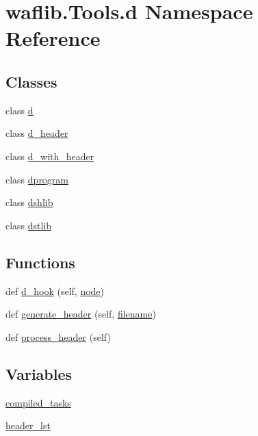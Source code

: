 \hypertarget{namespacewaflib_1_1_tools_1_1d}{}\section{waflib.\+Tools.\+d Namespace Reference}
\label{namespacewaflib_1_1_tools_1_1d}
\subsection*{Classes}
\begin{DoxyCompactItemize}
\item 
class \hyperlink{classwaflib_1_1_tools_1_1d_1_1d}{d}
\item 
class \hyperlink{classwaflib_1_1_tools_1_1d_1_1d__header}{d\+\_\+header}
\item 
class \hyperlink{classwaflib_1_1_tools_1_1d_1_1d__with__header}{d\+\_\+with\+\_\+header}
\item 
class \hyperlink{classwaflib_1_1_tools_1_1d_1_1dprogram}{dprogram}
\item 
class \hyperlink{classwaflib_1_1_tools_1_1d_1_1dshlib}{dshlib}
\item 
class \hyperlink{classwaflib_1_1_tools_1_1d_1_1dstlib}{dstlib}
\end{DoxyCompactItemize}
\subsection*{Functions}
\begin{DoxyCompactItemize}
\item 
def \hyperlink{namespacewaflib_1_1_tools_1_1d_a0b6f5907fb19962703822b05f5d2c7f6}{d\+\_\+hook} (self, \hyperlink{structnode}{node})
\item 
def \hyperlink{namespacewaflib_1_1_tools_1_1d_abeab4cb06670217a6a35b8a77933e947}{generate\+\_\+header} (self, \hyperlink{test__portburn_8cpp_a7efa5e9c7494c7d4586359300221aa5d}{filename})
\item 
def \hyperlink{namespacewaflib_1_1_tools_1_1d_ae7724c426c7d6b03c2f1e81bf03f40a9}{process\+\_\+header} (self)
\end{DoxyCompactItemize}
\subsection*{Variables}
\begin{DoxyCompactItemize}
\item 
\hyperlink{namespacewaflib_1_1_tools_1_1d_abcc48a86109544aa296665ef072cd152}{compiled\+\_\+tasks}
\item 
\hyperlink{namespacewaflib_1_1_tools_1_1d_a12bd52b8e8678fe7ca13904115bafb4e}{header\+\_\+lst}
\end{DoxyCompactItemize}


